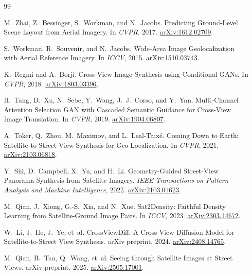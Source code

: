 \documentclass[11pt]{article}
\begin{document}
\clearpage
\begin{thebibliography}{99}
\small

M.~Zhai, Z.~Bessinger, S.~Workman, and N.~Jacobs.
\newblock Predicting Ground-Level Scene Layout from Aerial Imagery.
\newblock In \emph{CVPR}, 2017. \href{https://arxiv.org/abs/1612.02709}{arXiv:1612.02709}.

S.~Workman, R.~Souvenir, and N.~Jacobs.
\newblock Wide-Area Image Geolocalization with Aerial Reference Imagery.
\newblock In \emph{ICCV}, 2015. \href{https://arxiv.org/abs/1510.03743}{arXiv:1510.03743}.

K.~Regmi and A.~Borji.
\newblock Cross-View Image Synthesis using Conditional GANs.
\newblock In \emph{CVPR}, 2018. \href{https://arxiv.org/abs/1803.03396}{arXiv:1803.03396}.

H.~Tang, D.~Xu, N.~Sebe, Y.~Wang, J.~J.~Corso, and Y.~Yan.
\newblock Multi-Channel Attention Selection GAN with Cascaded Semantic Guidance for Cross-View Image Translation.
\newblock In \emph{CVPR}, 2019. \href{https://arxiv.org/abs/1904.06807}{arXiv:1904.06807}.

A.~Toker, Q.~Zhou, M.~Maximov, and L.~Leal-Taix{\'e}.
\newblock Coming Down to Earth: Satellite-to-Street View Synthesis for Geo-Localization.
\newblock In \emph{CVPR}, 2021. \href{https://arxiv.org/abs/2103.06818}{arXiv:2103.06818}.

Y.~Shi, D.~Campbell, X.~Yu, and H.~Li.
\newblock Geometry-Guided Street-View Panorama Synthesis from Satellite Imagery.
\newblock \emph{IEEE Transactions on Pattern Analysis and Machine Intelligence}, 2022. \href{https://arxiv.org/abs/2103.01623}{arXiv:2103.01623}.

M.~Qian, J.~Xiong, G.-S.~Xia, and N.~Xue.
\newblock Sat2Density: Faithful Density Learning from Satellite-Ground Image Pairs.
\newblock In \emph{ICCV}, 2023. \href{https://arxiv.org/abs/2303.14672}{arXiv:2303.14672}.

W.~Li, J.~He, J.~Ye, et~al.
\newblock CrossViewDiff: A Cross-View Diffusion Model for Satellite-to-Street View Synthesis.
\newblock arXiv preprint, 2024. \href{https://arxiv.org/abs/2408.14765}{arXiv:2408.14765}.

M.~Qian, B.~Tan, Q.~Wang, et~al.
\newblock Seeing through Satellite Images at Street Views.
\newblock arXiv preprint, 2025. \href{https://arxiv.org/abs/2505.17001}{arXiv:2505.17001}.


\end{thebibliography}
\end{document}
